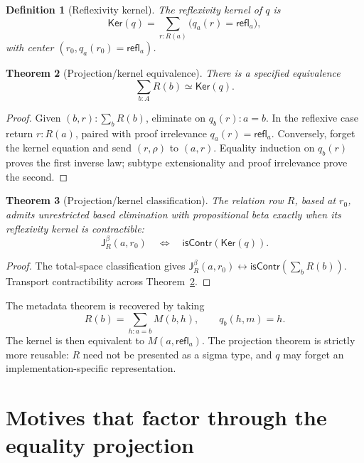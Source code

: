 \documentclass[10pt,reqno]{amsart}
\newtheorem{theorem}{Theorem}[section]
\newtheorem{definition}[theorem]{Definition}
\newcommand{\isContr}{\mathsf{isContr}}
\newcommand{\Eqv}{\simeq}
\newcommand{\Jbeta}{\mathsf J^\beta}
\newcommand{\refl}{\mathsf{refl}}
\newcommand{\Ker}{\mathsf{Ker}}
\begin{document}
\begin{definition}[Reflexivity kernel]
\label{def:reflexivity-kernel}
The reflexivity kernel of \(q\) is
\[
       \Ker(q)
       =
       \sum_{r:R(a)}\bigl(q_a(r)=\refl_a\bigr),
\tag{6.2}\label{eq:reflexivity-kernel}
\]
with center \((r_0,q_a(r_0)=\refl_a)\).
\end{definition}

\begin{theorem}[Projection/kernel equivalence]
\label{thm:projection-kernel-equiv}
There is a specified equivalence
\[
                       \sum_{b:A}R(b)\Eqv\Ker(q).
\tag{6.3}\label{eq:projection-kernel-equiv}
\]
\end{theorem}

\begin{proof}
Given \((b,r):\sum_bR(b)\), eliminate on \(q_b(r):a=b\).  In the reflexive case
return \(r:R(a)\), paired with proof irrelevance
\(q_a(r)=\refl_a\).  Conversely, forget the kernel equation and send
\((r,\rho)\) to \((a,r)\).  Equality induction on \(q_b(r)\) proves the first
inverse law; subtype extensionality and proof irrelevance prove the second.
\end{proof}

\begin{theorem}[Projection/kernel classification]
\label{thm:projection-kernel}
The relation row \(R\), based at \(r_0\), admits unrestricted based elimination
with propositional beta exactly when its reflexivity kernel is contractible:
\[
                  \Jbeta_R(a,r_0)
                  \quad\Longleftrightarrow\quad
                  \isContr(\Ker(q)).
\tag{6.4}\label{eq:projection-kernel}
\]
\end{theorem}

\begin{proof}
The total-space classification gives
\(\Jbeta_R(a,r_0)\leftrightarrow\isContr(\sum_bR(b))\).  Transport
contractibility across Theorem~\ref{thm:projection-kernel-equiv}.
\end{proof}

The metadata theorem is recovered by taking
\[
 R(b)=\sum_{h:a=b}M(b,h),
 \qquad
 q_b(h,m)=h.
\tag{6.5}\label{eq:metadata-as-projection}
\]
The kernel is then equivalent to \(M(a,\refl_a)\).  The projection theorem is
strictly more reusable: \(R\) need not be presented as a sigma type, and \(q\)
may forget an implementation-specific representation.

\section{Motives that factor through the equality projection}
\label{sec:factorization}
\end{document}
